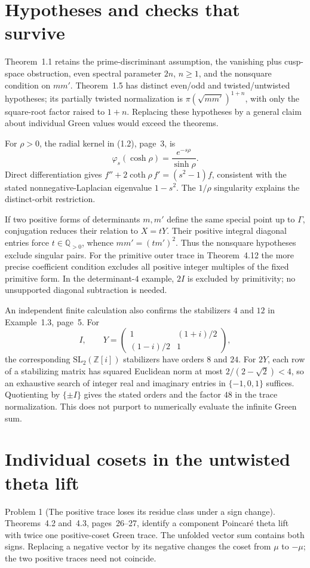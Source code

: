 \documentclass[10pt]{article}
\begin{document}
\section*{Hypotheses and checks that survive}
Theorem 1.1 retains the prime-discriminant assumption, the vanishing plus cusp-space obstruction, even spectral parameter \(2n\), \(n\geq1\), and the nonsquare condition on \(mm'\). Theorem 1.5 has distinct even/odd and twisted/untwisted hypotheses; its partially twisted normalization is \(\pi(\sqrt{mm'})^{1+n}\), with only the square-root factor raised to \(1+n\). Replacing these hypotheses by a general claim about individual Green values would exceed the theorems.\par
For \(\rho>0\), the radial kernel in (1.2), page 3, is \[\varphi_s(\cosh\rho)=\frac{e^{-s\rho}}{\sinh\rho}.\] Direct differentiation gives \(f''+2\coth\rho\,f'=(s^2-1)f\), consistent with the stated nonnegative-Laplacian eigenvalue \(1-s^2\). The \(1/\rho\) singularity explains the distinct-orbit restriction.\par
If two positive forms of determinants \(m,m'\) define the same special point up to \(\Gamma\), conjugation reduces their relation to \(X=tY\). Their positive integral diagonal entries force \(t\in\mathbb Q_{>0}\), whence \(mm'=(tm')^2\). Thus the nonsquare hypotheses exclude singular pairs. For the primitive outer trace in Theorem 4.12 the more precise coefficient condition excludes all positive integer multiples of the fixed primitive form. In the determinant-\(4\) example, \(2I\) is excluded by primitivity; no unsupported diagonal subtraction is needed.\par
An independent finite calculation also confirms the stabilizers \(4\) and \(12\) in Example 1.3, page 5. For \[I,\qquad
 Y=\begin{pmatrix}1&(1+i)/2\\(1-i)/2&1\end{pmatrix},\] the corresponding \(\mathrm{SL}_2(\mathbb Z[i])\) stabilizers have orders \(8\) and \(24\). For \(2Y\), each row of a stabilizing matrix has squared Euclidean norm at most \(2/(2-\sqrt2)<4\), so an exhaustive search of integer real and imaginary entries in \(\{-1,0,1\}\) suffices. Quotienting by \(\{\pm I\}\) gives the stated orders and the factor \(48\) in the trace normalization. This does not purport to numerically evaluate the infinite Green sum.\par
\section*{Individual cosets in the untwisted theta lift}
Problem 1 (The positive trace loses its residue class under a sign change).  Theorems 4.2 and 4.3, pages 26–27, identify a component Poincaré theta lift with twice one positive-coset Green trace. The unfolded vector sum contains both signs. Replacing a negative vector by its negative changes the coset from \(\mu\) to \(-\mu\); the two positive traces need not coincide.\par
\end{document}
